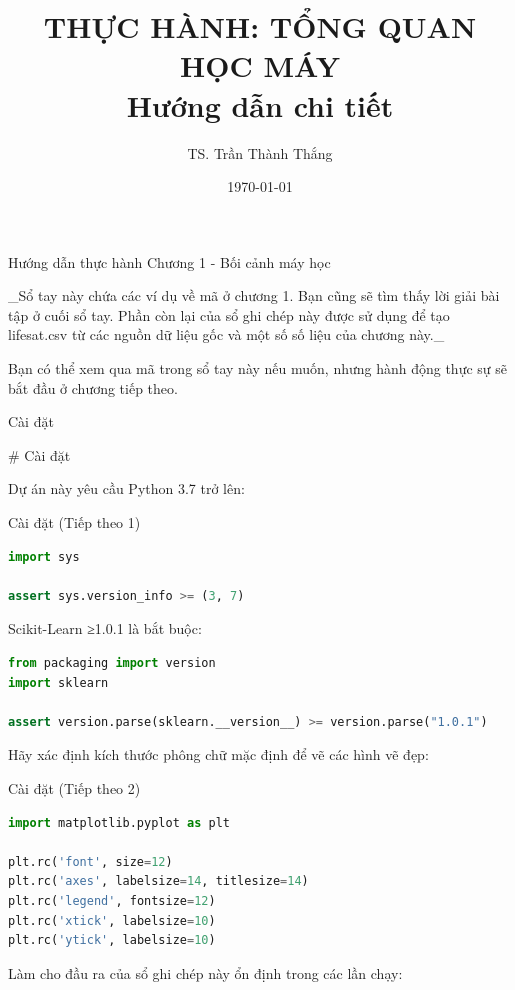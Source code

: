 \documentclass[aspectratio=169]{beamer}
\title[Thực hành Chương 1]{THỰC HÀNH: TỔNG QUAN HỌC MÁY \\ \vspace{0.5cm} \Large Hướng dẫn chi tiết}
\author{TS. Trần Thành Thắng}
\institute{Đại học Đông Á}
\date{\today}
\begin{document}
\begin{frame}[allowframebreaks]{Hướng dẫn thực hành}
Chương 1 - Bối cảnh máy học



\_Sổ tay này chứa các ví dụ về mã ở chương 1. Bạn cũng sẽ tìm thấy lời giải bài tập ở cuối sổ tay. Phần còn lại của sổ ghi chép này được sử dụng để tạo lifesat.csv từ các nguồn dữ liệu gốc và một số số liệu của chương này.\_



Bạn có thể xem qua mã trong sổ tay này nếu muốn, nhưng hành động thực sự sẽ bắt đầu ở chương tiếp theo.


\end{frame}

\begin{frame}[allowframebreaks]{Cài đặt}


  

    

  

  

    

  



\# Cài đặt

Dự án này yêu cầu Python 3.7 trở lên:


\end{frame}

\begin{frame}[fragile]{Cài đặt (Tiếp theo 1)}
\begin{lstlisting}[language=Python]
import sys

assert sys.version_info >= (3, 7)
\end{lstlisting}

Scikit-Learn ≥1.0.1 là bắt buộc:

\begin{lstlisting}[language=Python]
from packaging import version
import sklearn

assert version.parse(sklearn.__version__) >= version.parse("1.0.1")
\end{lstlisting}

Hãy xác định kích thước phông chữ mặc định để vẽ các hình vẽ đẹp:


\end{frame}

\begin{frame}[fragile]{Cài đặt (Tiếp theo 2)}
\begin{lstlisting}[language=Python]
import matplotlib.pyplot as plt

plt.rc('font', size=12)
plt.rc('axes', labelsize=14, titlesize=14)
plt.rc('legend', fontsize=12)
plt.rc('xtick', labelsize=10)
plt.rc('ytick', labelsize=10)
\end{lstlisting}

Làm cho đầu ra của sổ ghi chép này ổn định trong các lần chạy:


\end{frame}
\end{document}
